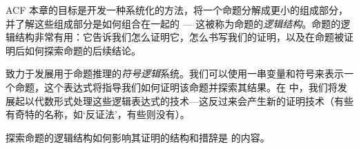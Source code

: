 ACF%
本章的目标是开发一种系统化的方法，将一个命题分解成更小的组成部分，并了解这些组成部分是如何组合在一起的 --- 这被称为命题的\textit{逻辑结构}。命题的逻辑结构非常有用：它告诉我们怎么证明它，怎么书写我们的证明，以及在命题被证明后如何探索命题的后续结论。

\begin{center} \vspace{-15pt}
\end{center}

 致力于发展用于命题推理的\textit{符号逻辑}系统。我们可以使用一串变量和符号来表示一个命题，这个表达式将指导我们如何证明该命题并探索其结果。在  中，我们将发展起以代数形式处理这些逻辑表达式的技术---这反过来会产生新的证明技术（有些有奇特的名称，如`反证法'，有些则没有）。

探索命题的逻辑结构如何影响其证明的结构和措辞是  的内容。
